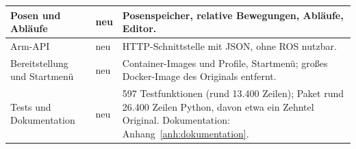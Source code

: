 \begin{table}[htbp]
\begin{tabularx}{\textwidth}{|>{\raggedright\arraybackslash}p{3.7cm}|>{\raggedright\arraybackslash}p{2.5cm}|L|}
        Posen und Abläufe & neu & Posenspeicher, relative Bewegungen, Abläufe, Editor.\\\hline
        Arm-API & neu & HTTP-Schnittstelle mit JSON, ohne ROS nutzbar.\\\hline
        Bereitstellung und Startmenü & neu & Container-Images und Profile, Startmenü; großes Docker-Image des Originals entfernt.\\\hline
        Tests und Dokumentation & neu & 597 Testfunktionen (rund 13.400 Zeilen); Paket rund 26.400 Zeilen Python, davon etwa ein Zehntel Original. Dokumentation: Anhang~\ref{anh:dokumentation}.\\\hline
    \end{tabularx}
\end{table}
